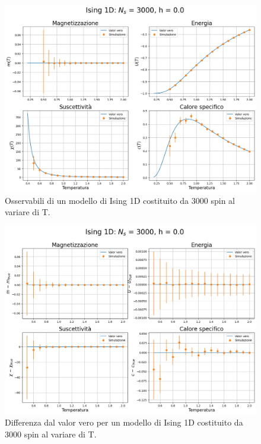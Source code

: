 \vspace*{\fill}

\newpage

\vspace*{\fill}

\begin{figure}[htbp]
    \centering
    \includegraphics[page=1, width=\textwidth]{Immagini/simIsing1D/obs/obs_3000_0.0.png}
    \caption{Osservabili di un modello di Ising 1D costituito da 3000 spin al variare di T.}
\end{figure}

\vspace*{\fill}

\newpage

\vspace*{\fill}

\begin{figure}[htbp]
    \centering
    \includegraphics[page=1, width=\textwidth]{Immagini/simIsing1D/obs/obs_3000_0.0_diff.png}
    \caption{Differenza dal valor vero per un modello di Ising 1D costituito da 3000 spin al variare di T.}
\end{figure}

